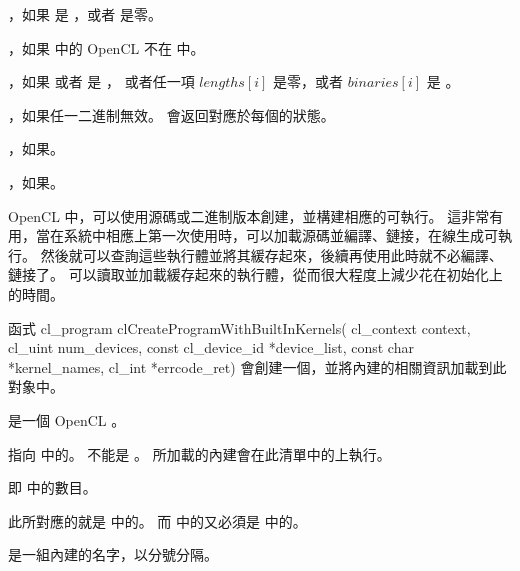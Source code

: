 \item {}，如果  是 ，或者  是零。

\item {}，如果  中的 OpenCL  不在  中。

\item {}，如果  或者  是 ，
或者任一項 $lengths[i]$ 是零，或者 $binaries[i]$ 是 。

\item {}，如果任一二進制無效。  會返回對應於每個的狀態。

\item {}，如果\scdevfailres。

\item {}，如果\schostfailres。
\stopigBase

OpenCL 中，可以使用源碼或二進制版本創建，並構建相應的可執行。
這非常有用，當在系統中相應上第一次使用時，可以加載源碼並編譯、鏈接，在線生成可執行。
然後就可以查詢這些執行體並將其緩存起來，後續再使用此時就不必編譯、鏈接了。
可以讀取並加載緩存起來的執行體，從而很大程度上減少花在初始化上的時間。

函式
\startCLFUNC
cl_program clCreateProgramWithBuiltInKernels(
			cl_context context,
			cl_uint num_devices,
			const cl_device_id *device_list,
			const char *kernel_names,
			cl_int *errcode_ret)
\stopCLFUNC
會創建一個，並將內建的相關資訊加載到此對象中。

 是一個 OpenCL 。

 指向  中的。
 不能是 。
所加載的內建會在此清單中的上執行。

 即  中的數目。

此所對應的就是  中的。
而  中的又必須是  中的。

 是一組內建的名字，以分號分隔。

